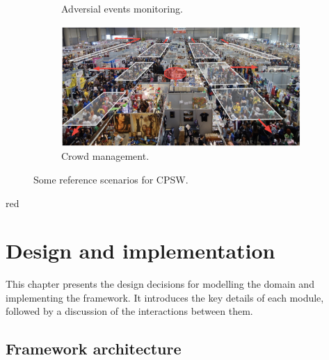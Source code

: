 \documentclass[12pt,a4paper,openright,twoside]{book}
\newcommand{\fonte}[1]{{\color{gray} \small \hypersetup{citecolor=gray} Source: #1}}
\begin{document}
\begin{figure}[t]
\begin{subfigure}[b]{0.49\textwidth}
        \caption{Adversial events monitoring.}
        \label{fig:cpsw21}
    \end{subfigure}
    \begin{subfigure}[b]{0.49\textwidth}
        \centering
        \includegraphics[width=\textwidth]{figures/cpsw-3.png}
        \caption{Crowd management.}
        \label{fig:cpsw3}
    \end{subfigure}
    \caption{Some reference scenarios for CPSW.}\vspace{-10pt}
    \label{fig:scenarios}
\end{figure}


\begin{color}{red}
\chapter{Design and implementation} 
\label{chap:impl-design}
\end{color}

This chapter presents the design decisions for modelling the domain and implementing 
    the framework. It introduces the key details of each module, followed by a discussion
    of the interactions between them.

\section{Framework architecture}
\end{document}

